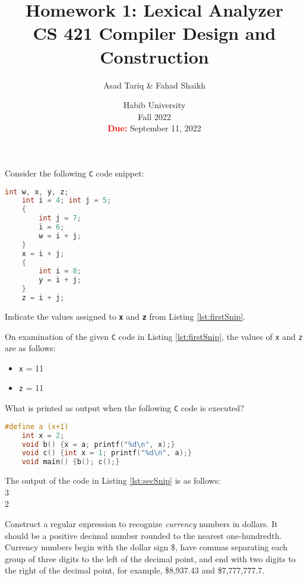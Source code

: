 \documentclass[addpoints]{exam}
\title{Homework 1: Lexical Analyzer\\CS 421 Compiler Design and Construction}
\author{Asad Tariq \& Fahad Shaikh}
\date{Habib University\\Fall 2022\\\textbf{\textcolor{red}{Due:}} September 11, 2022}
\begin{document}
\maketitle

\noindent

\begin{questions}

  \question[1]
  Consider the following \texttt{C} code snippet:
  \begin{lstlisting}[language=C, caption={\texttt{C} code snippet.}, label={lst:firstSnip}]
    int w, x, y, z;
    int i = 4; int j = 5;
    {
        int j = 7;
        i = 6;
        w = i + j;
    }
    x = i + j;
    {
        int i = 8;
        y = i + j;
    }
    z = i + j;
  \end{lstlisting}
  Indicate the values assigned to \textbf{\texttt{x}} and \textbf{\texttt{z}} from Listing \ref{lst:firstSnip}.

  \begin{solution}
    On examination of the given \texttt{C} code in Listing \ref{lst:firstSnip}, the values of \texttt{x} and \texttt{z} are as follows:
    \begin{itemize}
      \item \texttt{x} = 11
      \item \texttt{z} = 11
    \end{itemize}
  \end{solution}

  \question[1]
  What is printed as output when the following \texttt{C} code is executed?
  \begin{lstlisting}[language=C, caption={\texttt{C} code snippet.}, label={lst:secSnip}]
    #define a (x+1)
    int x = 2;
    void b() {x = a; printf("%d\n", x);}
    void c() {int x = 1; printf("%d\n", a);}
    void main() {b(); c();}
  \end{lstlisting}

  \begin{solution}
    The output of the code in Listing \ref{lst:secSnip} is as follows:\\3\\2
  \end{solution}

  \question[1]
  Construct a regular expression to recognize \textit{currency} numbers in dollars. It should be a positive decimal number rounded to the nearest one-hundredth. Currency numbers begin with the dollar sign \$, have commas separating each group of three digits to the left of the decimal point, and end with two digits to the right of the decimal point, for example, \$8,937.43 and \$7,777,777.7.
  

\end{questions}
\end{document}
